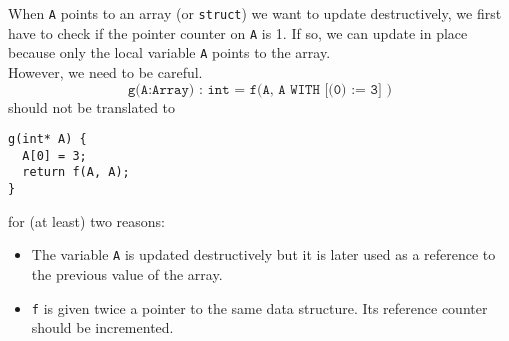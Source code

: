 \documentclass[12pt,a4paper]{article}
\newcommand{\cl}[1]{\texttt{#1}}
\begin{document}
When \cl{A} points to an array (or \cl{struct}) we want to update destructively, we first have to check if the pointer counter on \cl{A} is 1. If so, we can update in place because only the local variable \cl{A} points to the array.\\

However, we need to be careful.
$$ \cl{g(A:Array) : int = f(A, A WITH [(0) := 3] )}$$
should not be translated to
\begin{lstlisting}
g(int* A) {
  A[0] = 3;
  return f(A, A);
}
\end{lstlisting}
for (at least) two reasons:
\begin{itemize}
\item The variable \cl{A} is updated destructively but it is later used as a reference to the previous value of the array.
\item \cl{f} is given twice a pointer to the same data structure. Its reference counter should be incremented.
\end{itemize}
\end{document}
